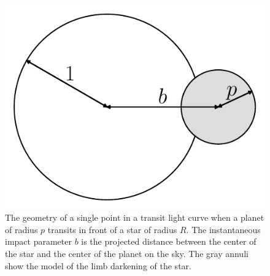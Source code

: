 \documentclass[12pt,preprint]{aastex}
\newcommand{\figlabel}[1]{\label{fig:#1}}
\begin{document}
\clearpage

\begin{figure}[htbp]
    \begin{center}
        \includegraphics[width=\textwidth]{figures/geom.pdf}
    \end{center}
    \caption{The geometry of a single point in a transit light curve when a
        planet of radius $p$ transits in front of a star of radius $R$. The
        instantaneous impact parameter $b$ is the projected distance between
        the center of the star and the center of the planet on the sky. The
        gray annuli show the model of the limb darkening of the star. \figlabel{geom}}
\end{figure}
\end{document}
